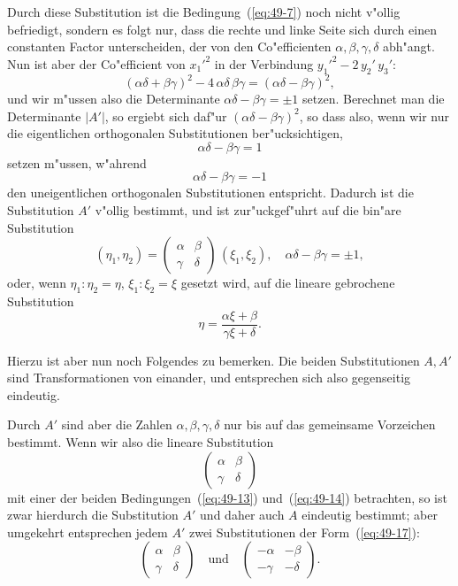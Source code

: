 \documentclass[12pt,a4paper]{article}
\theoremstyle{definition}
\begin{document}
Durch diese Substitution ist die Bedingung~(\ref{eq:49-7}) noch nicht v"ollig befriedigt, sondern es folgt nur, dass die rechte und linke Seite sich durch einen constanten Factor unterscheiden, der von den Co"efficienten $\alpha, \beta, \gamma, \delta$ abh"angt. Nun ist aber der Co"efficient von $x_1'^2$ in der Verbindung $y_1'^2 - 2\,y_2'\,y_3'$:
\[
(\alpha\delta + \beta\gamma)^2 - 4\,\alpha\delta\,\beta\gamma = (\alpha\delta - \beta\gamma)^2,
\]
und wir m"ussen also die Determinante $\alpha\delta - \beta\gamma = \pm 1$ setzen. Berechnet man die Determinante $|A'|$, so ergiebt sich daf"ur $(\alpha\delta - \beta\gamma)^2$, so dass also, wenn wir nur die eigentlichen orthogonalen Substitutionen ber"ucksichtigen,
\begin{equation}\label{eq:49-13}
\alpha\delta - \beta\gamma = 1
\end{equation}
setzen m"ussen, w"ahrend
\begin{equation}\label{eq:49-14}
\alpha\delta - \beta\gamma = -1
\end{equation}
den uneigentlichen orthogonalen Substitutionen entspricht. Dadurch ist die Substitution $A'$ v"ollig bestimmt, und ist zur"uckgef"uhrt auf die bin"are Substitution
\begin{equation}\label{eq:49-15}
(\eta_1, \eta_2) = \begin{pmatrix} \alpha & \beta \\ \gamma & \delta \end{pmatrix}\,(\xi_1, \xi_2), \quad \alpha\delta - \beta\gamma = \pm 1,
\end{equation}
oder, wenn $\eta_1 : \eta_2 = \eta$, $\xi_1 : \xi_2 = \xi$ gesetzt wird, auf die lineare gebrochene Substitution
\begin{equation}\label{eq:49-16}
\eta = \frac{\alpha\xi + \beta}{\gamma\xi + \delta}.
\end{equation}

Hierzu ist aber nun noch Folgendes zu bemerken. Die beiden Substitutionen $A, A'$ sind Transformationen von einander, und entsprechen sich also gegenseitig eindeutig.

Durch $A'$ sind aber die Zahlen $\alpha, \beta, \gamma, \delta$ nur bis auf das gemeinsame Vorzeichen bestimmt. Wenn wir also die lineare Substitution
\begin{equation}\label{eq:49-17}
\begin{pmatrix} \alpha & \beta \\ \gamma & \delta \end{pmatrix}
\end{equation}
mit einer der beiden Bedingungen~(\ref{eq:49-13}) und~(\ref{eq:49-14}) betrachten, so ist zwar hierdurch die Substitution $A'$ und daher auch $A$ eindeutig bestimmt; aber umgekehrt entsprechen jedem $A'$ zwei Substitutionen der Form~(\ref{eq:49-17}):
\[
\begin{pmatrix} \alpha & \beta \\ \gamma & \delta \end{pmatrix}
\quad \text{und} \quad
\begin{pmatrix} -\alpha & -\beta \\ -\gamma & -\delta \end{pmatrix}.
\]
\end{document}
